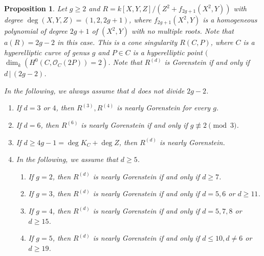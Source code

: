 \documentclass[12pt]{amsart}
\newtheorem{prop}[thm]{Proposition}
\theoremstyle{definition}
\theoremstyle{remark}
\numberwithin{equation}{section}
\newcommand{\cO}{\mathcal O}
\renewcommand{\:}{\colon}
\begin{document}
\begin{prop}\label{hypell} 
Let $g\ge 2$ and $R= k[X,Y,Z]/(Z^2 + f_{2g+ 1}(X^2,Y))$ with degree 
$\deg (X,Y,Z) = (1,2, 2g+1)$, where $f_{2g+1 }(X^2,Y)$ is a 
homogeneous polynomial of 
degree $2g+1$ of $(X^2, Y)$ with no multiple roots.
Note that $a(R)= 2g-2$ in this case. 
This is a cone singularity $R(C,P)$, where 
$C$ is a hyperelliptic curve of genus $g$ and $P\in C$ is a hyperelliptic point 
$($$\dim_k( H^0(C, \cO_C(2P))=2)$. 
Note that $R^{(d)}$ is Gorenstein if and only if $d \,|\, (2g-2)$.   
\par
In the following, we always assume that $d$ does not divide $2g-2$. 
\begin{enumerate}
\item[(1)] If $d=3$ or $4$, then $R^{(3)}, R^{(4)}$ is nearly Gorenstein for every $g$.
\item[(2)] If $d=6$, then $R^{(6)}$ is nearly Gorenstein 
if and only if $g \not\equiv 2 \pmod{3}$. 
\item[(3)] If $d\ge 4g-1 = \deg K_C + \deg Z$, then $R^{(d)}$ is nearly Gorenstein. 
\item[(4)] In the following, we assume that $d\ge 5$. 
\begin{enumerate}
\item[{\rm (a)}] If $g=2$, then $R^{(d)}$ is nearly Gorenstein if and only if $d\ge 7$.
\item[{\rm (b)}]  If $g=3$, then $R^{(d)}$ is nearly Gorenstein if and only if $d=5, 6$ or 
$d\ge 11$.
\item[{\rm (c)}] 
 If $g=4$, then $R^{(d)}$ is nearly Gorenstein if and only if 
$d =5,7, 8$ or $d\ge 15$.
\item[{\rm (d)}]  If $g=5$, then $R^{(d)}$ is nearly Gorenstein if and only if 
$d \le 10, d\ne 6$ or $d\ge 19$.
\end{enumerate}
\end{enumerate}
\end{prop}
\end{document}
